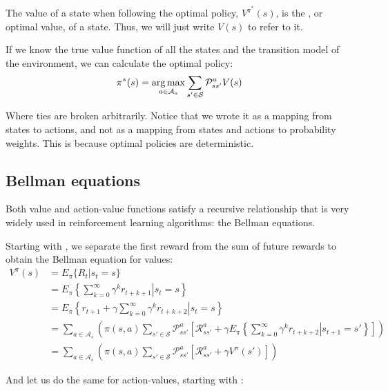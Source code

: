 The value of a state when following the optimal policy, $V^{\pi^*}(s)$, is the
, or optimal value, of a state. Thus, we will just write $V(s)$ to refer to it.

If we know the true value function of all the states and the transition model of
the environment, we can calculate the optimal policy:
\begin{equation}
  \pi^*(s) = \argmax_{a\in\mathcal{A}_s} \sum_{s'\in\mathcal{S}}\mathcal{P}^a_{ss'}V(s)
  \label{eq:optimal-policy-value}
\end{equation}

Where ties are broken arbitrarily. Notice that we wrote it as a mapping from
states to actions, and not as a mapping from states and actions to probability
weights. This is because optimal policies are deterministic.

\citep[Subsection~17.1.2]{russell2009aima}

\subsection{Bellman equations}
Both value and action-value functions satisfy a recursive relationship that is
very widely used in reinforcement learning algorithms: the Bellman equations.

Starting with , we separate the first reward
from the sum of future rewards to obtain the Bellman equation for values:
\begin{equation}
\begin{split}
  V^\pi(s) & = E_\pi \lbrace R_t | s_t = s \rbrace \\
  & = E_\pi \left\{ \left. \sum_{k=0}^\infty \gamma^kr_{t+k+1} \right| s_t = s \right\} \\
  & = E_\pi \left\{ \left. r_{t+1} + \gamma\sum_{k=0}^\infty \gamma^kr_{t+k+2} \right| s_t = s \right\} \\
  & = \sum_{a\in\mathcal{A}_s} \left( \pi(s, a) \sum_{s' \in \mathcal{S}}\mathcal{P}^a_{ss'}
\left[\mathcal{R}^a_{ss'} + \gamma E_\pi \left\{ \left. \sum_{k=0}^\infty
\gamma^kr_{t+k+2} \right| s_{t+1} = s' \right\} \right] \right) \\
  & = \sum_{a\in\mathcal{A}_s} \left( \pi(s, a) \sum_{s' \in \mathcal{S}}\mathcal{P}^a_{ss'}
\left[\mathcal{R}^a_{ss'} + \gamma V^\pi(s') \right] \right)
\end{split}
\label{eq:bellman-v}
\end{equation}

And let us do the same for action-values, starting with
:

